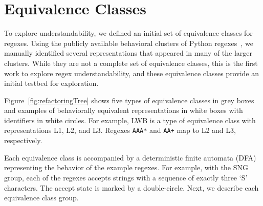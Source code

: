 \section{Equivalence Classes}
\label{sec:refactoring}
To explore understandability, we defined an initial set of equivalence classes for regexes.
Using the publicly available behavioral clusters of Python regexes~\cite{chapman2016}, we manually identified several representations that appeared in many of the larger clusters.
While they are not a complete set of equivalence classes, this is the first work to explore regex understandability, and these equivalence classes provide an initial testbed for exploration.

Figure~\ref{fig:refactoringTree} shows five types of equivalence classes in grey boxes and examples of behaviorally equivalent {representations} in white boxes with identifiers in white circles. For example, LWB is a type of equivalence class with representations L1, L2, and L3. Regexes \verb!AAA*! and \verb!AA+! map to L2 and L3, respectively.

Each equivalence class is accompanied by a deterministic finite automata (DFA) representing the behavior of the example regexes. For example, with the SNG group, each of the regexes accepts strings with a sequence of exactly three `S' characters. The accept state is marked by a double-circle.
Next, we describe each equivalence class group.

